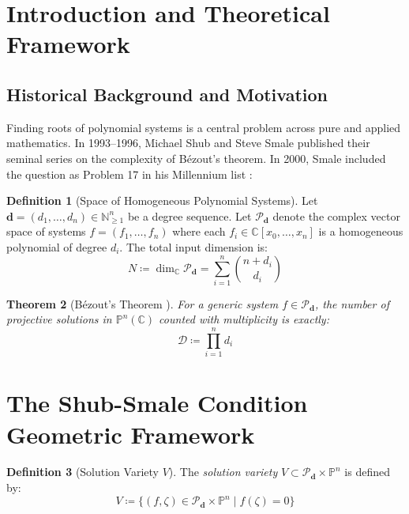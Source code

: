 \documentclass[11pt,a4paper]{article}
\newtheorem{theorem}{Theorem}[section]
\theoremstyle{definition}
\newtheorem{definition}[theorem]{Definition}
\begin{document}
\tableofcontents
\newpage

\section{Introduction and Theoretical Framework}

\subsection{Historical Background and Motivation}
Finding roots of polynomial systems is a central problem across pure and applied mathematics.
In 1993--1996, Michael Shub and Steve Smale \cite{shub_smale1993} published their seminal series on the complexity of B\'ezout's theorem.
In 2000, Smale included the question as Problem 17 in his Millennium list \cite{smale2000}:

\begin{definition}[Space of Homogeneous Polynomial Systems]\label{def:poly_space}
Let $\boldsymbol{d} = (d_1, \dots, d_n) \in \mathbb{N}_{\ge 1}^n$ be a degree sequence.
Let $\mathcal{P}_{\boldsymbol{d}}$ denote the complex vector space of systems $f = (f_1, \dots, f_n)$ where each $f_i \in \mathbb{C}[x_0, \dots, x_n]$ is a homogeneous polynomial of degree $d_i$.
The total input dimension is:
\begin{equation}\label{eq:input_dim}
N \coloneqq \dim_{\mathbb{C}} \mathcal{P}_{\boldsymbol{d}} = \sum_{i=1}^n \binom{n + d_i}{d_i}
\end{equation}
\end{definition}

\begin{theorem}[B\'ezout's Theorem \cite{shub_smale1993}]\label{thm:bezout}
For a generic system $f \in \mathcal{P}_{\boldsymbol{d}}$, the number of projective solutions in $\mathbb{P}^n(\mathbb{C})$ counted with multiplicity is exactly:
\begin{equation}\label{eq:bezout_bound}
\mathcal{D} \coloneqq \prod_{i=1}^n d_i
\end{equation}
\end{theorem}

\section{The Shub-Smale Condition Geometric Framework}

\begin{definition}[Solution Variety $V$]\label{def:solution_variety}
The \emph{solution variety} $V \subset \mathcal{P}_{\boldsymbol{d}} \times \mathbb{P}^n$ is defined by:
\begin{equation}\label{eq:sol_var}
V \coloneqq \{ (f, \zeta) \in \mathcal{P}_{\boldsymbol{d}} \times \mathbb{P}^n \mid f(\zeta) = 0 \}
\end{equation}
\end{definition}
\end{document}
